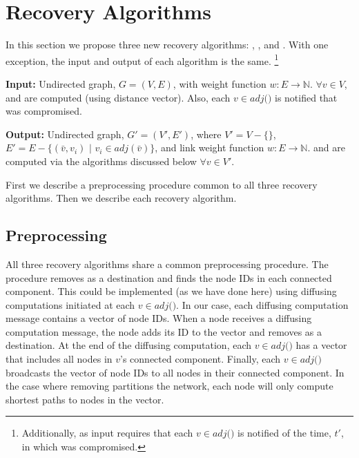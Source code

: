 \section{Recovery Algorithms}
\label{sec:algs}

In this section we propose three new recovery algorithms: \seconds, \purges, and \cprs.  
With one exception, the input and output of each algorithm is the same. 
{\footnote {\small Additionally, as input \cpr requires that each $v \in adj($\bads$)$ is notified of the time, $t'$, in which \bad was compromised.}}

{\bf Input:}  Undirected graph, $G=(V,E)$, with weight function $w: E \rightarrow \mathbb{N}$.  $\forall v \in V$,  \minv and \dmatrix are computed
(using distance vector). Also, each $v \in adj($\bads$)$ is notified that \bad was compromised.

{\bf Output:} Undirected graph, $G'=(V',E')$, where $V' = V -\{$\bads$\}$, $E'=E - \{(\bar{v},v_i)$ $|$ $v_i \in adj(\bar{v}) \}$,
and link weight function $w:E \rightarrow \mathbb{N}$.  \minvv and \dmatrixv are computed via the algorithms discussed below $\forall  v \in V'$. 

First we describe a preprocessing procedure common to all three recovery algorithms. Then we describe each recovery algorithm. 


\subsection{Preprocessing}
\label{subsec:preprocess}
All three recovery algorithms share a common preprocessing procedure.  The procedure removes \bad as a destination and finds the node IDs in each connected component. 
This could be implemented (as we have done here) using diffusing computations \cite{Dijkstra80} initiated at each $v \in adj($\bads$)$. 
In our case, each diffusing computation message contains a vector of node IDs.  When 
a node receives a diffusing computation message, the node adds its ID to the vector and removes \bad as a destination. At the end of the diffusing computation, 
each $v \in adj($\bads$)$ has a vector that includes all nodes in $v$'s connected component. Finally, each $v \in adj($\bads$)$ broadcasts the vector of node IDs to 
all nodes in their connected component. In the case where removing \bad partitions the network, each node will only compute shortest paths to nodes in the vector. 


